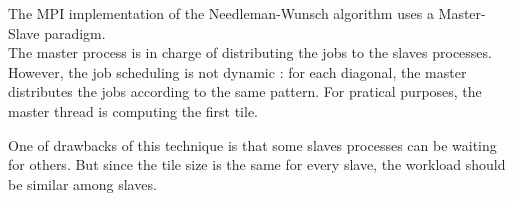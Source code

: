 The MPI implementation of the Needleman-Wunsch algorithm uses a Master-Slave paradigm. \\
The master process is in charge of distributing the jobs to the slaves processes. However, the job scheduling is not dynamic : for each diagonal, the master distributes the jobs according to the same pattern. For pratical purposes, the master thread is computing the first tile.

One of drawbacks of this technique is that some slaves processes can be waiting for others. But since the tile size is the same for every slave, the workload should be similar among slaves. \\
